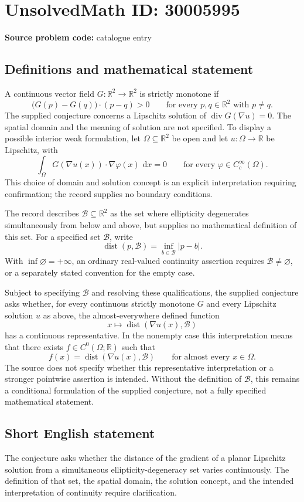 \documentclass[11pt]{article}
\newcommand{\R}{\mathbb{R}}
\newcommand{\dd}{\,\mathrm{d}}
\begin{document}
\section*{UnsolvedMath ID: 30005995}
\textbf{Source problem code:} catalogue entry
\subsection{Definitions and mathematical statement}
A continuous vector field \(G\colon\R^2\to\R^2\) is strictly monotone if
\[
\bigl(G(p)-G(q)\bigr)\cdot(p-q)>0
\qquad\text{for every }p,q\in\R^2\text{ with }p\ne q.
\]
The supplied conjecture concerns a Lipschitz solution of \(\operatorname{div}G(\nabla u)=0\). The spatial domain and the meaning of solution are not specified. To display a possible interior weak formulation, let \(\Omega\subseteq\R^2\) be open and let \(u\colon\Omega\to\R\) be Lipschitz, with
\[
\int_\Omega G(\nabla u(x))\cdot\nabla\varphi(x)\,\dd x=0
\qquad\text{for every }\varphi\in C_c^\infty(\Omega).
\]
This choice of domain and solution concept is an explicit interpretation requiring confirmation; the record supplies no boundary conditions.

The record describes \(\mathcal B\subseteq\R^2\) as the set where ellipticity degenerates simultaneously from below and above, but supplies no mathematical definition of this set. For a specified set \(\mathcal B\), write
\[
\operatorname{dist}(p,\mathcal B)=\inf_{b\in\mathcal B}|p-b|.
\]
With \(\inf\varnothing=+\infty\), an ordinary real-valued continuity assertion requires \(\mathcal B\ne\varnothing\), or a separately stated convention for the empty case.

Subject to specifying \(\mathcal B\) and resolving these qualifications, the supplied conjecture asks whether, for every continuous strictly monotone \(G\) and every Lipschitz solution \(u\) as above, the almost-everywhere defined function
\[
x\longmapsto\operatorname{dist}(\nabla u(x),\mathcal B)
\]
has a continuous representative. In the nonempty case this interpretation means that there exists \(f\in C^0(\Omega;\R)\) such that
\[
f(x)=\operatorname{dist}(\nabla u(x),\mathcal B)
\qquad\text{for almost every }x\in\Omega.
\]
The source does not specify whether this representative interpretation or a stronger pointwise assertion is intended. Without the definition of \(\mathcal B\), this remains a conditional formulation of the supplied conjecture, not a fully specified mathematical statement.
\subsection{Short English statement}
The conjecture asks whether the distance of the gradient of a planar Lipschitz solution from a simultaneous ellipticity-degeneracy set varies continuously. The definition of that set, the spatial domain, the solution concept, and the intended interpretation of continuity require clarification.
\end{document}
